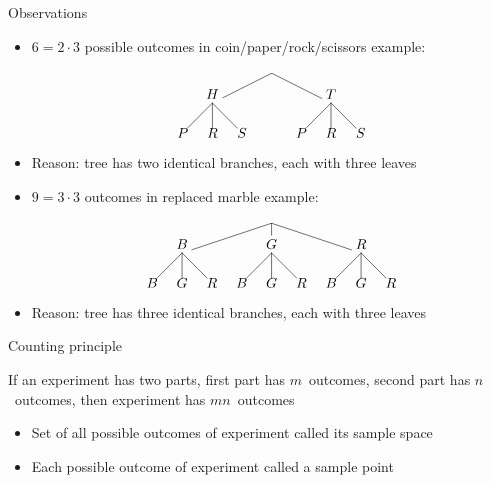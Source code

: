\documentclass{beamer}
\theoremstyle{definition}
\begin{document}
\begin{frame}{Observations}
\begin{itemize}
\item $6=2\cdot 3$ possible outcomes in coin/paper/rock/scissors example:
\[\begin{xy}<.75cm,0cm>:
(0,0)="0";
(-2,-1)="-21";
(2,-1)="21";
"0";"-21"*+!D{H}**\dir{-};
"0";"21"*+!D{T}**\dir{-};
"-21";(-3,-2)*{P}**\dir{-};
"-21";(-2,-2)*{R}**\dir{-};
"-21";(-1,-2)*{S}**\dir{-};
"21";(1,-2)*{P}**\dir{-};
"21";(2,-2)*{R}**\dir{-};
"21";(3,-2)*{S}**\dir{-};
\end{xy}\]
\item Reason: tree has two \alert{identical} branches, each with three leaves
\item $9=3\cdot 3$ outcomes in replaced marble example:
\[\begin{xy}<.75cm,0cm>:
(0,0)="0";
(-3,-1)="-31";
(0,-1)="01";
(3,-1)="31";
"0";"-31"*+!D{B}**\dir{-};
"0";"01"*+!D{G}**\dir{-};
"0";"31"*+!D{R}**\dir{-};
"-31";(-4,-2)*{B}**\dir{-};
"-31";(-3,-2)*{G}**\dir{-};
"-31";(-2,-2)*{R}**\dir{-};
"01";(-1,-2)*{B}**\dir{-};
"01";(0,-2)*{G}**\dir{-};
"01";(1,-2)*{R}**\dir{-};
"31";(2,-2)*{B}**\dir{-};
"31";(3,-2)*{G}**\dir{-};
"31";(4,-2)*{R}**\dir{-};
\end{xy}\]
\item Reason: tree has three \alert{identical} branches,
each with three leaves
\end{itemize}
\end{frame}

\begin{frame}{Counting principle}
\begin{lemma}
If an experiment has two parts, first
part has $m$~outcomes, second part
has $n$~outcomes, then experiment
has $mn$~outcomes
\end{lemma}
\begin{definition}
\begin{itemize}
\item Set of all possible outcomes of experiment called
its \alert{sample space}
\item Each possible outcome of experiment called
a \alert{sample point}
\end{itemize}
\end{definition}
\end{frame}
\end{document}
